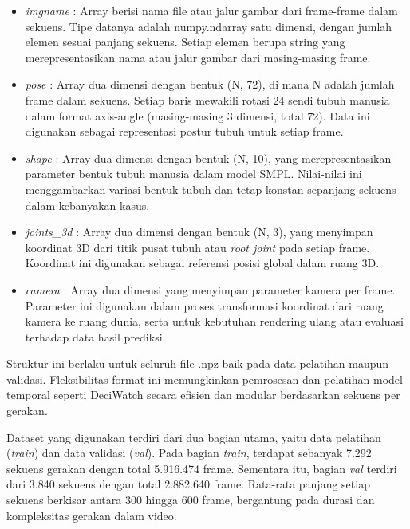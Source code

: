 \begin{itemize}
    \item {\textit{imgname}} : Array berisi nama file atau jalur gambar dari frame-frame dalam sekuens. Tipe datanya adalah {numpy.ndarray} satu dimensi, dengan jumlah elemen sesuai panjang sekuens. Setiap elemen berupa string yang merepresentasikan nama atau jalur gambar dari masing-masing frame.
    
    \item {\textit{pose}} : Array dua dimensi dengan bentuk {(N, 72)}, di mana {N} adalah jumlah frame dalam sekuens. Setiap baris mewakili rotasi 24 sendi tubuh manusia dalam format axis-angle (masing-masing 3 dimensi, total 72). Data ini digunakan sebagai representasi postur tubuh untuk setiap frame.
    
    \item {\textit{shape}} : Array dua dimensi dengan bentuk {(N, 10)}, yang merepresentasikan parameter bentuk tubuh manusia dalam model SMPL. Nilai-nilai ini menggambarkan variasi bentuk tubuh dan tetap konstan sepanjang sekuens dalam kebanyakan kasus.
    
    \item {\textit{joints\_3d}} : Array dua dimensi dengan bentuk {(N, 3)}, yang menyimpan koordinat 3D dari titik pusat tubuh atau \textit{root joint} pada setiap frame. Koordinat ini digunakan sebagai referensi posisi global dalam ruang 3D.
    
    \item {\textit{camera}} : Array dua dimensi yang menyimpan parameter kamera per frame. Parameter ini digunakan dalam proses transformasi koordinat dari ruang kamera ke ruang dunia, serta untuk kebutuhan rendering ulang atau evaluasi terhadap data hasil prediksi.
\end{itemize}

Struktur ini berlaku untuk seluruh file {.npz} baik pada data pelatihan maupun validasi. Fleksibilitas format ini memungkinkan pemrosesan dan pelatihan model temporal seperti DeciWatch secara efisien dan modular berdasarkan sekuens per gerakan.

Dataset yang digunakan terdiri dari dua bagian utama, yaitu data pelatihan (\textit{train}) dan data validasi (\textit{val}). Pada bagian \textit{train}, terdapat sebanyak 7.292 sekuens gerakan dengan total 5.916.474 frame. Sementara itu, bagian \textit{val} terdiri dari 3.840 sekuens dengan total 2.882.640 frame. Rata-rata panjang setiap sekuens berkisar antara 300 hingga 600 frame, bergantung pada durasi dan kompleksitas gerakan dalam video.

